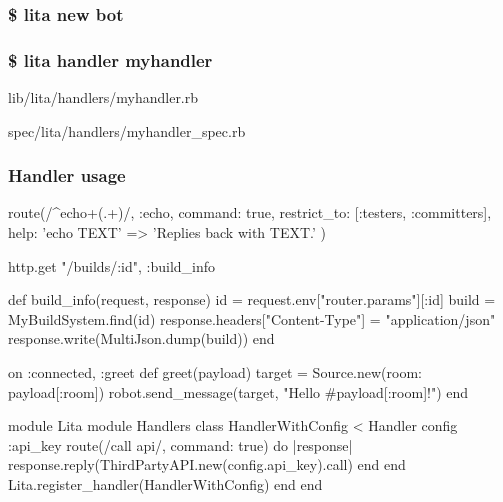 \documentclass[
paper=128mm:96mm, %
fontsize=11pt, %
pagesize, %
parskip=half-, %
]{scrartcl} %
\theoremstyle{mythmstyle} %
\begin{document}

\subsubsection{\$ lita new bot}
\clearpage


\clearpage


\subsubsection{\$ lita handler myhandler }
\clearpage


lib/lita/handlers/myhandler.rb
\clearpage


spec/lita/handlers/myhandler\_spec.rb
\clearpage


\subsubsection{Handler usage}
\begin{rubycode}
  route(/^echo\s+(.+)/, :echo, command: true, restrict_to: [:testers, :committers], help: {
    'echo TEXT' => 'Replies back with TEXT.'
  })
\end{rubycode}
\begin{rubycode}
  http.get "/builds/:id", :build_info

  def build_info(request, response)
    id = request.env["router.params"][:id]
    build = MyBuildSystem.find(id)
    response.headers["Content-Type"] = "application/json"
    response.write(MultiJson.dump(build))
  end
\end{rubycode}
\begin{rubycode}
  on :connected, :greet
  def greet(payload)
    target = Source.new(room: payload[:room])
    robot.send_message(target, "Hello #{payload[:room]}!")
  end
\end{rubycode}
\begin{rubycode}
  module Lita
    module Handlers
      class HandlerWithConfig < Handler
        config :api_key
        route(/call api/, command: true) do |response|
          response.reply(ThirdPartyAPI.new(config.api_key).call)
        end
      end
      Lita.register_handler(HandlerWithConfig)
    end
  end
\end{rubycode}
\clearpage
\end{document}
